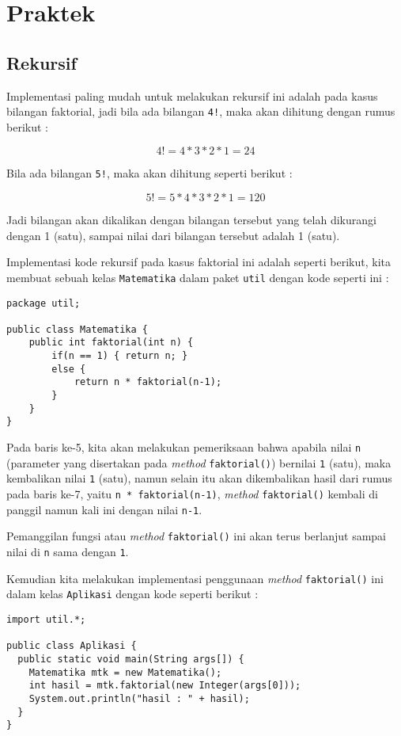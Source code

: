 \section{Praktek}

\subsection{Rekursif}

Implementasi paling mudah untuk melakukan rekursif ini adalah pada kasus bilangan faktorial, jadi bila ada bilangan \texttt{4!}, maka akan dihitung dengan rumus berikut :

\[ 4! = 4 * 3 * 2 * 1 = 24 \]

Bila ada bilangan \texttt{5!}, maka akan dihitung seperti berikut :

\[ 5! = 5 * 4 * 3 * 2 * 1 = 120 \]

Jadi bilangan akan dikalikan dengan bilangan tersebut yang telah dikurangi dengan 1 (satu), sampai nilai dari bilangan tersebut adalah 1 (satu).

Implementasi kode rekursif pada kasus faktorial ini adalah seperti berikut, kita membuat sebuah kelas \texttt{Matematika} dalam paket \texttt{util} dengan kode seperti ini :

\begin{lstlisting}
package util;

public class Matematika {
    public int faktorial(int n) {
        if(n == 1) { return n; }
        else {
            return n * faktorial(n-1);
        }
    }
}
\end{lstlisting}

Pada baris ke-5, kita akan melakukan pemeriksaan bahwa apabila nilai \texttt{n} (parameter yang disertakan pada \textit{method} \texttt{faktorial()}) bernilai \texttt{1} (satu), maka kembalikan nilai \texttt{1} (satu), namun selain itu akan dikembalikan hasil dari rumus pada baris ke-7, yaitu \texttt{n * faktorial(n-1)}, \textit{method} \texttt{faktorial()} kembali di panggil namun kali ini dengan nilai \texttt{n-1}.

Pemanggilan fungsi atau \textit{method} \texttt{faktorial()} ini akan terus berlanjut sampai nilai di \texttt{n} sama dengan \texttt{1}.

Kemudian kita melakukan implementasi penggunaan \textit{method} \texttt{faktorial()} ini dalam kelas \texttt{Aplikasi} dengan kode seperti berikut :

\begin{lstlisting}
import util.*;

public class Aplikasi {
  public static void main(String args[]) {
    Matematika mtk = new Matematika();
    int hasil = mtk.faktorial(new Integer(args[0]));
    System.out.println("hasil : " + hasil);
  }
}
\end{lstlisting}

